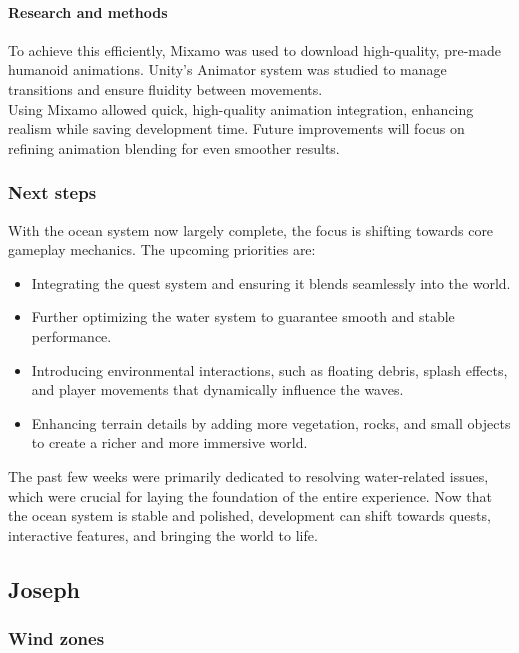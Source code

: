 \documentclass{article}
\begin{document}
\paragraph{Research and methods}\hfill

To achieve this efficiently, Mixamo was used to download high-quality, pre-made humanoid animations. Unity's Animator system was studied to manage transitions and ensure fluidity between movements.\\

Using Mixamo allowed quick, high-quality animation integration, enhancing realism while saving development time. Future improvements will focus on refining animation blending for even smoother results.


\subsubsection*{Next steps}\hfill

With the ocean system now largely complete, the focus is shifting towards core gameplay mechanics. The upcoming priorities are:
\begin{itemize}
    \item Integrating the quest system and ensuring it blends seamlessly into the world.
    \item Further optimizing the water system to guarantee smooth and stable performance.
    \item Introducing environmental interactions, such as floating debris, splash effects, and player movements that dynamically influence the waves.
    \item Enhancing terrain details by adding more vegetation, rocks, and small objects to create a richer and more immersive world.
\end{itemize}
The past few weeks were primarily dedicated to resolving water-related issues, which were crucial for laying the foundation of the entire experience. Now that the ocean system is stable and polished, development can shift towards quests, interactive features, and bringing the world to life.





\newpage
\subsection{Joseph}
\subsubsection{Wind zones}
\end{document}
